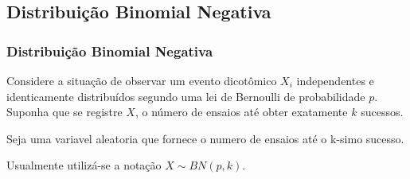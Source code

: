 \subsection{Distribuição Binomial Negativa}
\begin{frame}
\frametitle{Distribuição Binomial Negativa}
Considere a situação de observar um evento dicotômico $X_{i}$ independentes e identicamente distribuídos segundo uma lei de Bernoulli de probabilidade $p$. Suponha que se registre $X$, o número de ensaios até obter exatamente $k$ sucessos. \pause

\begin{dist}[aaa] 
Seja uma variavel aleatoria que fornece o numero de ensaios até o k-simo sucesso. 

Usualmente utilizá-se a notação $X \sim BN(p,k)$.
\end{dist}
\end{frame}